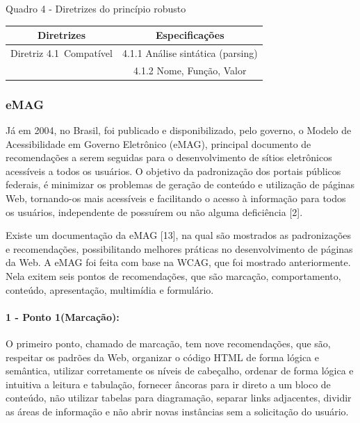 \documentclass[a4paper]{article}
\begin{document}
\begin{titlepage}
Quadro 4 - Diretrizes do princípio robusto\\[-1cm]
\begin{center}
	\fontsize{8pt}{8pt}\selectfont
	\begin{longtable}{|c|c|}
		\hline
		Diretrizes & Especificações \\
		\hline
		Diretriz 4.1 Compatível& 4.1.1 Análise sintática (parsing)\\
		& 4.1.2 Nome, Função, Valor\\
		\hline
	\end{longtable}
\end{center}

\subsubsection{eMAG}

Já em 2004, no Brasil, foi publicado e disponibilizado, pelo governo, o Modelo de Acessibilidade em Governo Eletrônico (eMAG), principal documento de recomendações a serem seguidas para o desenvolvimento de sítios eletrônicos acessíveis a todos os usuários. O objetivo da padronização dos portais públicos federais, é minimizar os problemas de geração de conteúdo e utilização de páginas Web, tornando-os mais acessíveis e facilitando o acesso à informação para todos os usuários, independente de possuírem ou não alguma deficiência [2].

Existe um documentação da eMAG [13], na qual são mostrados as padronizações e recomendações, possibilitando melhores práticas no desenvolvimento de páginas da Web. A eMAG foi feita com base na WCAG, que foi mostrado anteriormente. Nela exitem seis pontos de recomendações, que são marcação, comportamento, conteúdo, apresentação, multimídia e formulário.

\paragraph{1 - Ponto 1(Marcação): }

O primeiro ponto, chamado de marcação, tem nove recomendações, que são, respeitar os padrões da Web, organizar o código HTML de forma lógica e semântica, utilizar corretamente os níveis de cabeçalho, ordenar de forma lógica e intuitiva a leitura e tabulação, fornecer âncoras para ir direto a um bloco de conteúdo, não utilizar tabelas para diagramação, separar links adjacentes, dividir as áreas de informação e não abrir novas instâncias sem a solicitação do usuário.


\end{titlepage}
\end{document}
